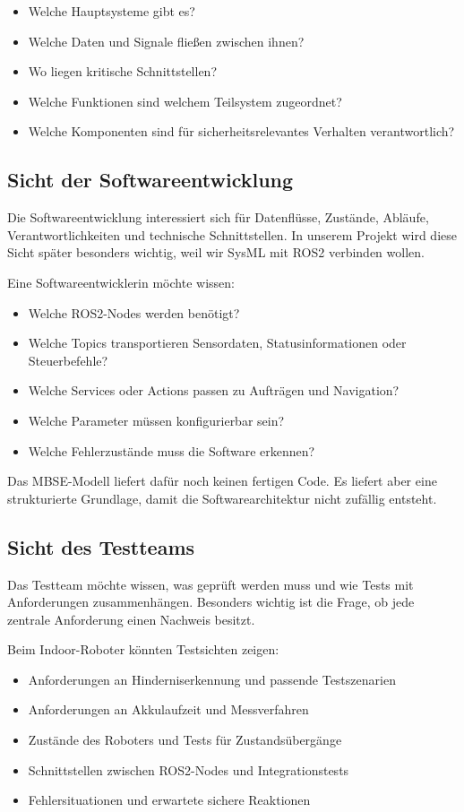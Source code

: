 \begin{itemize}
    \item Welche Hauptsysteme gibt es?
    \item Welche Daten und Signale fließen zwischen ihnen?
    \item Wo liegen kritische Schnittstellen?
    \item Welche Funktionen sind welchem Teilsystem zugeordnet?
    \item Welche Komponenten sind für sicherheitsrelevantes Verhalten verantwortlich?
\end{itemize}

\subsection{Sicht der Softwareentwicklung}
Die Softwareentwicklung interessiert sich für Datenflüsse, Zustände, Abläufe, Verantwortlichkeiten und technische Schnittstellen. In unserem Projekt wird diese Sicht später besonders wichtig, weil wir SysML mit ROS2 verbinden wollen.

Eine Softwareentwicklerin möchte wissen:

\begin{itemize}
    \item Welche ROS2-Nodes werden benötigt?
    \item Welche Topics transportieren Sensordaten, Statusinformationen oder Steuerbefehle?
    \item Welche Services oder Actions passen zu Aufträgen und Navigation?
    \item Welche Parameter müssen konfigurierbar sein?
    \item Welche Fehlerzustände muss die Software erkennen?
\end{itemize}

Das MBSE-Modell liefert dafür noch keinen fertigen Code. Es liefert aber eine strukturierte Grundlage, damit die Softwarearchitektur nicht zufällig entsteht.

\subsection{Sicht des Testteams}
Das Testteam möchte wissen, was geprüft werden muss und wie Tests mit Anforderungen zusammenhängen. Besonders wichtig ist die Frage, ob jede zentrale Anforderung einen Nachweis besitzt.

Beim Indoor-Roboter könnten Testsichten zeigen:

\begin{itemize}
    \item Anforderungen an Hinderniserkennung und passende Testszenarien
    \item Anforderungen an Akkulaufzeit und Messverfahren
    \item Zustände des Roboters und Tests für Zustandsübergänge
    \item Schnittstellen zwischen ROS2-Nodes und Integrationstests
    \item Fehlersituationen und erwartete sichere Reaktionen
\end{itemize}

